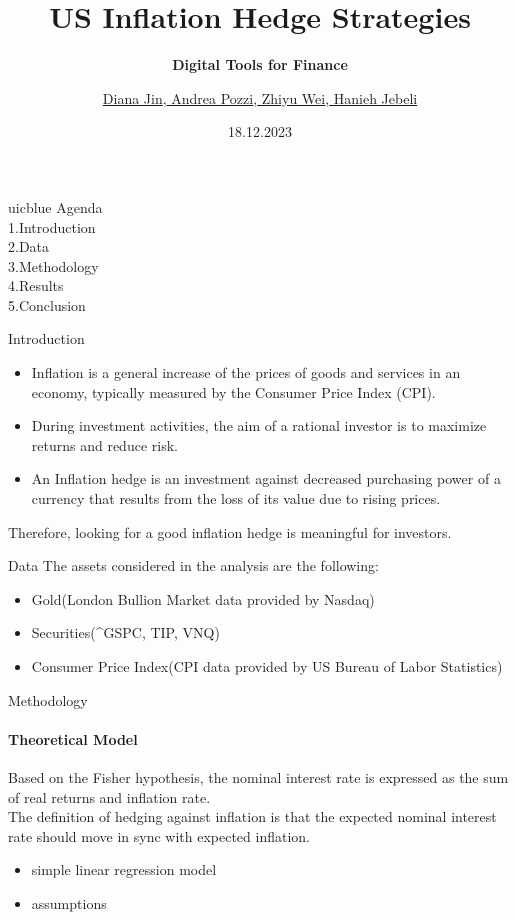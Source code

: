 \documentclass{beamer}
\title{US Inflation Hedge Strategies}
\subtitle{\textbf{Digital Tools for Finance}}
\author{\href{mailto:diana.jin@uzh.ch}{Diana Jin},\href{mailto:andrea.pozzi@uzh.ch}{ Andrea Pozzi},\href{mailto:zhiyu.wei@uzh.ch}{ Zhiyu Wei},\href{mailto:hanieh.jebeli@uzh.ch}{ Hanieh Jebeli}}
\date{18.12.2023}
\begin{document}
\maketitle



\begin{chapter}{uicblue}
{Agenda}\\[1em]
{1.Introduction\\[1em]
2.Data\\[1em]
3.Methodology\\[1em]
4.Results\\[1em]
5.Conclusion}
\end{chapter}

\begin{frame}{Introduction}
\begin{itemize}
\item Inflation is a general increase of the prices of goods and services in an economy, typically
measured by the Consumer Price Index (CPI). 
\item During investment activities, the aim of a
rational investor is to maximize returns and reduce risk.
\item An Inflation hedge is an investment against decreased purchasing power of a currency
that results from the loss of its value due to rising prices. 
\end{itemize}
Therefore, looking for a good inflation hedge is meaningful for investors.
\end{frame}

\begin{frame}[fragile]{Data}
The assets considered in the analysis are the following:\\
\begin{itemize}
\item Gold\quad(London Bullion Market data provided by Nasdaq)
\item Securities\quad(\textasciicircum{}GSPC, TIP, VNQ)
\item Consumer Price Index\quad(CPI data provided by US Bureau of Labor Statistics)
\end{itemize}
\end{frame}


\begin{frame}[fragile]{Methodology}
\framesubtitle{Theoretical Model}
Based on the Fisher hypothesis, the nominal interest rate is expressed as the sum of real returns and inflation rate. \\
The definition of hedging against inflation is that the expected nominal interest rate should
move in sync with expected inflation.
\begin{itemize}
\item simple linear regression model
\item assumptions
\end{itemize}
\end{frame}
\end{document}
